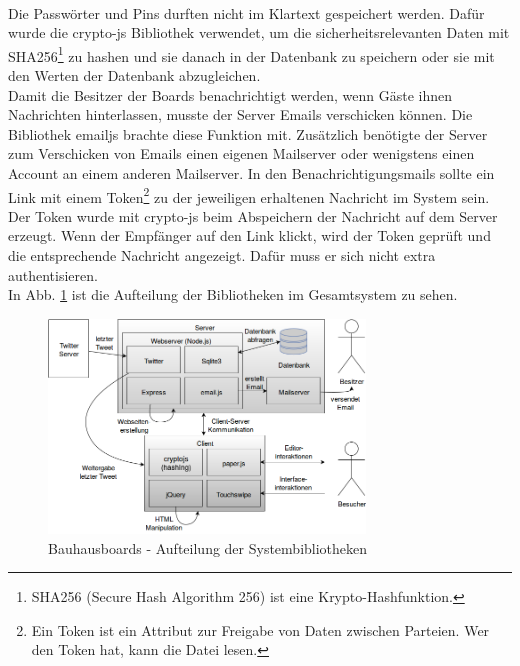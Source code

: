 \\
Die Passwörter und Pins durften nicht im Klartext gespeichert werden.
Dafür wurde die crypto-js Bibliothek verwendet, um die sicherheitsrelevanten Daten mit SHA256\footnote{SHA256 (Secure Hash Algorithm 256) ist eine Krypto-Hashfunktion.} zu hashen und sie danach in der Datenbank zu speichern oder sie mit den Werten der Datenbank abzugleichen.
\\
Damit die Besitzer der Boards benachrichtigt werden, wenn Gäste ihnen Nachrichten hinterlassen, musste der Server Emails verschicken können.
Die Bibliothek emailjs brachte diese Funktion mit. Zusätzlich benötigte der Server zum Verschicken von Emails einen eigenen Mailserver oder wenigstens einen Account an einem anderen Mailserver.
In den Benachrichtigungsmails sollte ein Link mit einem Token\footnote{Ein Token ist ein Attribut zur Freigabe von Daten zwischen Parteien. Wer den Token hat, kann die Datei lesen.} zu der jeweiligen erhaltenen Nachricht im System sein. Der Token wurde mit crypto-js beim Abspeichern der Nachricht auf dem Server erzeugt. Wenn der Empfänger auf den Link klickt, wird der Token geprüft und die entsprechende Nachricht angezeigt. Dafür muss er sich nicht extra authentisieren.
\\
In Abb. \ref{img:highLevelSystemDiagram} ist die Aufteilung der Bibliotheken im Gesamtsystem zu sehen.
\begin{figure}[h!]
  \centering
    \includegraphics[width=0.75\textwidth]{./img/HighLevelSystemDiagram.png}
  \caption{Bauhausboards - Aufteilung der Systembibliotheken}
  \label{img:highLevelSystemDiagram}
\end{figure}
